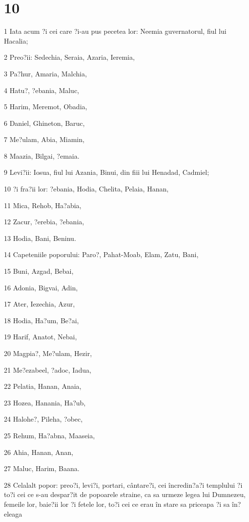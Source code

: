 \chapter{10}

\par 1 Iata acum ?i cei care ?i-au pus pecetea lor: Neemia guvernatorul, fiul lui Hacalia;
\par 2 Preo?ii: Sedechia, Seraia, Azaria, Ieremia,
\par 3 Pa?hur, Amaria, Malchia,
\par 4 Hatu?, ?ebania, Maluc,
\par 5 Harim, Meremot, Obadia,
\par 6 Daniel, Ghineton, Baruc,
\par 7 Me?ulam, Abia, Miamin,
\par 8 Maazia, Bilgai, ?emaia.
\par 9 Levi?ii: Iosua, fiul lui Azania, Binui, din fiii lui Henadad, Cadmiel;
\par 10 ?i fra?ii lor: ?ebania, Hodia, Chelita, Pelaia, Hanan,
\par 11 Mica, Rehob, Ha?abia,
\par 12 Zacur, ?erebia, ?ebania,
\par 13 Hodia, Bani, Beninu.
\par 14 Capeteniile poporului: Paro?, Pahat-Moab, Elam, Zatu, Bani,
\par 15 Buni, Azgad, Bebai,
\par 16 Adonia, Bigvai, Adin,
\par 17 Ater, Iezechia, Azur,
\par 18 Hodia, Ha?um, Be?ai,
\par 19 Harif, Anatot, Nebai,
\par 20 Magpia?, Me?ulam, Hezir,
\par 21 Me?ezabeel, ?adoc, Iadua,
\par 22 Pelatia, Hanan, Anaia,
\par 23 Hozea, Hanania, Ha?ub,
\par 24 Halohe?, Pileha, ?obec,
\par 25 Rehum, Ha?abna, Maaseia,
\par 26 Ahia, Hanan, Anan,
\par 27 Maluc, Harim, Baana.
\par 28 Celalalt popor: preo?i, levi?i, portari, cântare?i, cei încredin?a?i templului ?i to?i cei ce s-au despar?it de popoarele straine, ca sa urmeze legea lui Dumnezeu, femeile lor, baie?ii lor ?i fetele lor, to?i cei ce erau în stare sa priceapa ?i sa în?eleaga
